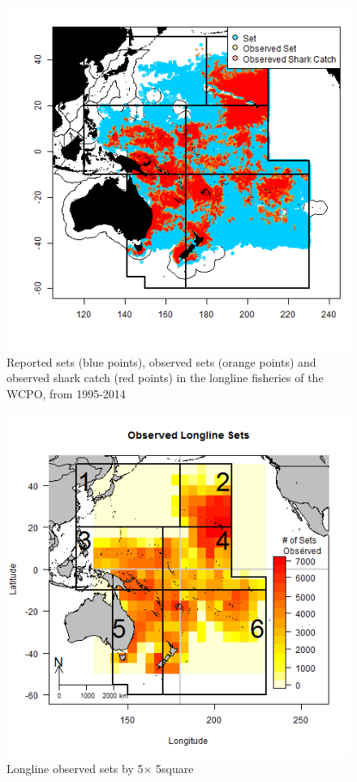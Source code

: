 \documentclass[12pt]{SCreport}
\begin{document}
\begin{figure}
\begin{center}
\includegraphics[scale=0.95]{../GRAPHICS/Defined/FIG_02_MAP_sets}
\caption{\label{fig:fig02} Reported sets (blue points), observed sets (orange points) and observed shark catch (red points) in the longline fisheries of the WCPO, from 1995-2014}
\end{center}
\end{figure}

\begin{figure}
\begin{center}
\includegraphics[scale=0.95]{../GRAPHICS/Defined/FIG_03_obs_ll_sets}
\caption{\label{fig:fig03} Longline observed sets by 5\degree $\times$ 5\degree square}
\end{center}
\end{figure}
\end{document}
